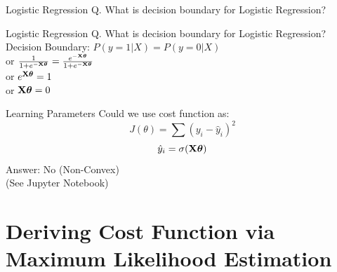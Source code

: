 \documentclass{beamer}
\begin{document}
\begin{frame}{Logistic Regression}
Q. What is decision boundary for Logistic Regression?
\end{frame}
\begin{frame}{Logistic Regression}
Q. What is decision boundary for Logistic Regression? \\
\hspace{0.4cm} Decision Boundary: $P(y = 1|X) = P(y = 0 | X)$\\
\vspace{0.3cm}
\hspace{4cm} or $\frac{1}{1 + e^{-\mathbf{X}\boldsymbol{\theta}}} = \frac{e^{-\mathbf{X}\boldsymbol{\theta}}}{1 + e^{-\mathbf{X}\boldsymbol{\theta}}}$  \\
\vspace{0.3cm}
\hspace{4cm} or $e^{\mathbf{X}\boldsymbol{\theta}} = 1$\\
\vspace{0.3cm}
\hspace{4cm} or $\mathbf{X}\boldsymbol{\theta} = 0$
\end{frame}
\begin{frame}{Learning Parameters}
Could we use cost function as:
\begin{equation*}
J(\theta) = \sum (y_{i} - \hat{y}_{i})^{2}
\end{equation*}
\begin{equation*}
\hat{y}_{i} = \sigma(\mathbf{X}\boldsymbol{\theta})
\end{equation*}
Answer: No (Non-Convex) \\ \hspace{1.2cm} (See Jupyter Notebook)
\end{frame}


\section{Deriving Cost Function via Maximum Likelihood Estimation}
\end{document}
